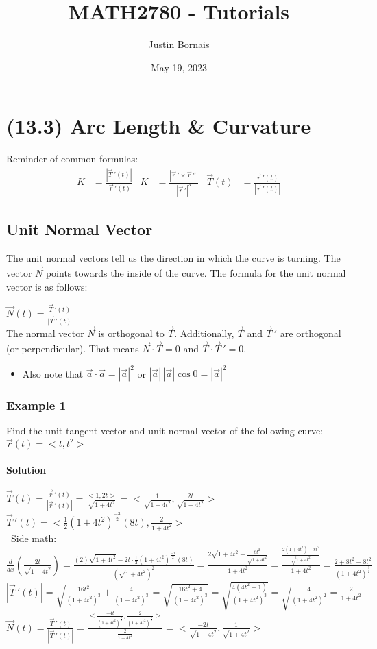 \documentclass{article}
\title{MATH2780 - Tutorials}
\author{Justin Bornais}
\date{May 19, 2023}
\begin{document}
\maketitle
\section{(13.3) Arc Length \& Curvature}
Reminder of common formulas: \LARGE
\begin{align*}
    K&=\frac{|\vec{T}\,'(t)|}{|\vec{r}\,'(t)}  & K&=\frac{|\vec{r}\,'\times \vec{r}\,''|}{|\vec{r}\,'|^3} & \vec{T}(t)&=\frac{\vec{r}\,'(t)}{|\vec{r}\,'(t)|}
\end{align*}
\normalsize

\subsection{Unit Normal Vector}
The unit normal vectors tell us the direction in which the curve is turning. The vector $\vec{N}$ points towards the inside of the curve. The formula for the unit normal vector is as follows:

\LARGE$\vec{N}(t)=\frac{\vec{T}\,'(t)}{|\vec{T}\,'(t)}$\normalsize
\\The normal vector $\vec{N}$ is orthogonal to $\vec{T}$. Additionally, $\vec{T}$ and $\vec{T}\,'$ are orthogonal (or perpendicular). That means $\vec{N}\cdot\vec{T}=0$ and $\vec{T}\cdot\vec{T}\,'=0$.
\begin{itemize}
    \item Also note that $\vec{a}\cdot\vec{a}=|\vec{a}|^2$ or $|\vec{a}|\,|\vec{a}|\cos{0}=|\vec{a}|^2$
\end{itemize}

\subsubsection{Example 1}
Find the unit tangent vector and unit normal vector of the following curve: $\vec{r}(t)=<t,t^2>$
\paragraph{Solution} $\vec{T}(t)=\frac{\vec{r}\,'(t)}{|\vec{r}\,'(t)|}=\frac{<1,2t>}{\sqrt{1+4t^2}}=<\frac{1}{\sqrt{1+4t^2}},\frac{2t}{\sqrt{1+4t^2}}>$
\\$\vec{T}\,'(t)=<\frac{1}{2}(1+4t^2)^{\frac{-3}{2}}(8t),\frac{2}{1+4t^2}>$
\\\textbullet\ Side math: $\frac{d}{dx}\left(\frac{2t}{\sqrt{1+4t^2}}\right)
    =\frac{(2)\sqrt{1+4t^2}-2t\cdot\frac{1}{2}(1+4t^2)^{\frac{-1}{2}}(8t)}{\left(\sqrt{1+4t^2}\right)^2}
    =\frac{2\sqrt{1+4t^2}-\frac{8t^2}{\sqrt{1+4t^2}}}{1+4t^2}
    =\frac{\frac{2(1+4t^2)-8t^2}{\sqrt{1+4t^2}}}{1+4t^2}
    =\frac{2+8t^2-8t^2}{(1+4t^2)^{\frac{3}{2}}}$
\\$|\vec{T}\,'(t)|=\sqrt{\frac{16t^2}{(1+4t^2)^3}+\frac{4}{(1+4t^2)^3}}
    =\sqrt{\frac{16t^2+4}{(1+4t^2)^3}}=\sqrt{\frac{4(4t^2+1)}{(1+4t^2)^3}}
    =\sqrt{\frac{4}{(1+4t^2)^2}}=\frac{2}{1+4t^2}$
\\$\vec{N}(t)=\frac{\vec{T}\,'(t)}{|\vec{T}\,'(t)|}=\frac{<\frac{-4t}{(1+4t^2)^\frac{3}{2}},\frac{2}{(1+4t^2)^\frac{3}{2}}>}{\frac{2}{1+4t^2}}=<\frac{-2t}{\sqrt{1+4t^2}},\frac{1}{\sqrt{1+4t^2}}>$
\end{document}
